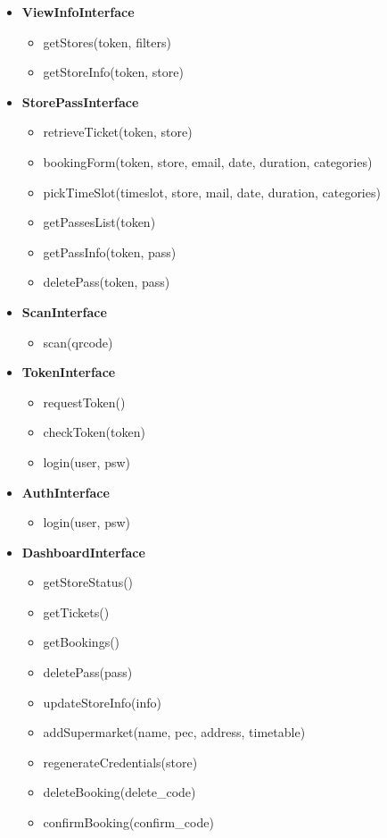 \begin{itemize}
	\item \textbf{ViewInfoInterface}
	\begin{itemize}
		\item getStores(token, filters)
		\item getStoreInfo(token, store)
	\end{itemize}

	
	\item \textbf{StorePassInterface}
	\begin{itemize}
		\item retrieveTicket(token, store)
		\item bookingForm(token, store, email, date, duration, categories)
		\item pickTimeSlot(timeslot, store, mail, date, duration, categories)
		\item getPassesList(token)
		\item getPassInfo(token, pass)
		\item deletePass(token, pass)
	\end{itemize}

	\item \textbf{ScanInterface}
	\begin{itemize}
		\item scan(qrcode)
	\end{itemize}
	
	\item \textbf{TokenInterface}
	\begin{itemize}
		\item requestToken()
		\item checkToken(token)
		\item login(user, psw)
	\end{itemize}

	\item \textbf{AuthInterface}
	\begin{itemize}
		\item login(user, psw)
	\end{itemize}

	\item \textbf{DashboardInterface}
	\begin{itemize}
		\item getStoreStatus()
		\item getTickets()
		\item getBookings()
		\item deletePass(pass)
		\item updateStoreInfo(info)
		\item addSupermarket(name, pec, address, timetable)
		\item regenerateCredentials(store)
		\item deleteBooking(delete\_code)
		\item confirmBooking(confirm\_code)
	\end{itemize}


\end{itemize}
